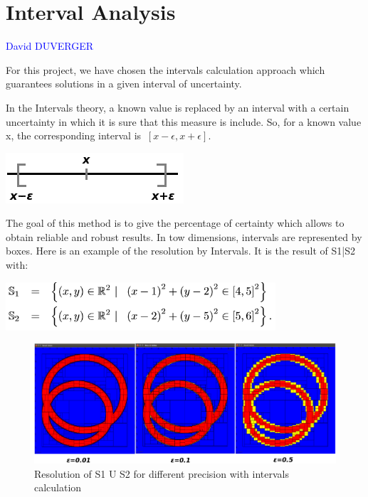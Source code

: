 \documentclass[a4paper,12pt]{report}
\begin{document}
    \section{Interval Analysis}
    
	\vspace{0.5 cm}
	
	\textcolor{blue} {David DUVERGER}
	
	\vspace{0.3 cm}
	
	 For this project, we have chosen the intervals calculation    approach which guarantees solutions in a given interval of uncertainty.

	\vspace{0.5 cm}
	
	In the Intervals theory, a known value is replaced by an interval with a certain uncertainty in which it is sure that this measure is include. So, for a known value x, the corresponding interval is $\ [x-\epsilon, x+\epsilon] $.


    \begin{center} \includegraphics[scale=0.8]{Interval.png} \end{center}
    
    The goal of this method is to give the percentage of certainty which allows to obtain reliable and robust results. In tow dimensions, intervals are represented by boxes. Here is an example of the resolution by Intervals. It is the result of S1|S2 with:
    
    	\vspace{0.6 cm}
    	

    \begin{center} \includegraphics{Formule1.png} \end{center}
    
    \begin{figure}[!h] 
    \center
    	\includegraphics[scale=0.4]{Boxes.png} 
    	\caption{Resolution of S1 U S2 for different precision with intervals calculation } 
    \label{S1 U S2}
	\end{figure} 
\end{document}
